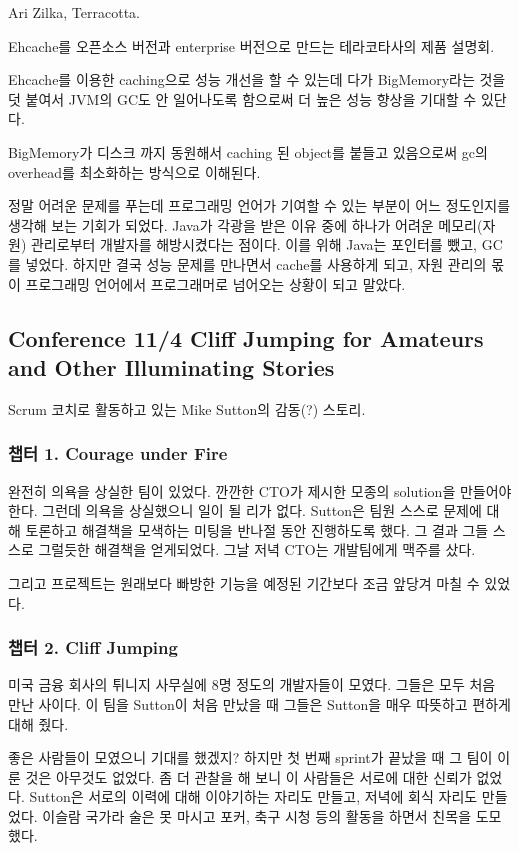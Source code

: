 \documentclass[a4paper]{article}
\begin{document}
Ari Zilka, Terracotta.
 
Ehcache를 오픈소스 버전과 enterprise 버전으로 만드는 테라코타사의 제품 설명회.
 
Ehcache를 이용한 caching으로 성능 개선을 할 수 있는데 다가
BigMemory라는 것을 덧 붙여서 JVM의 GC도 안 일어나도록 함으로써 더 높은
성능 향상을 기대할 수 있단다.
 
BigMemory가 디스크 까지 동원해서 caching 된 object를 붙들고 있음으로써
gc의 overhead를 최소화하는 방식으로 이해된다.
 
정말 어려운 문제를 푸는데 프로그래밍 언어가 기여할 수 있는 부분이 어느 
정도인지를 생각해 보는 기회가 되었다. 
Java가 각광을 받은 이유 중에 하나가 어려운 메모리(자원) 관리로부터 개발자를 
해방시켰다는 점이다. 이를 위해 Java는 포인터를 뺐고, GC를 넣었다. 
하지만 결국 성능 문제를 만나면서 cache를 사용하게 되고, 자원 관리의 몫이 
프로그래밍 언어에서 프로그래머로 넘어오는 상황이 되고 말았다.

\subsection{Conference 11/4 Cliff Jumping for Amateurs and Other
  Illuminating Stories}
 
Scrum 코치로 활동하고 있는 Mike Sutton의 감동(?) 스토리.
 
\subsubsection{챕터 1. Courage under Fire}
 
완전히 의욕을 상실한 팀이 있었다. 깐깐한 CTO가 제시한 모종의 solution을
만들어야 한다.  그런데 의욕을 상실했으니 일이 될 리가 없다. Sutton은
팀원 스스로 문제에 대해 토론하고 해결책을 모색하는 미팅을 반나절 동안
진행하도록 했다. 그 결과 그들 스스로 그럴듯한 해결책을 얻게되었다. 그날
저녁 CTO는 개발팀에게 맥주를 샀다.
 
그리고 프로젝트는 원래보다 빠방한 기능을 예정된 기간보다 조금 앞당겨 마칠 수 
있었다.
 
\subsubsection{챕터 2. Cliff Jumping}
 
미국 금융 회사의 튀니지 사무실에 8명 정도의 개발자들이 모였다. 그들은
모두 처음 만난 사이다.  이 팀을 Sutton이 처음 만났을 때 그들은 Sutton을
매우 따뜻하고 편하게 대해 줬다.
 
좋은 사람들이 모였으니 기대를 했겠지? 하지만 첫 번째 sprint가 끝났을 때
그 팀이 이룬 것은 아무것도 없었다. 좀 더 관찰을 해 보니 이 사람들은
서로에 대한 신뢰가 없었다. Sutton은 서로의 이력에 대해 이야기하는
자리도 만들고, 저녁에 회식 자리도 만들었다. 이슬람 국가라 술은 못
마시고 포커, 축구 시청 등의 활동을 하면서 친목을 도모했다.
 
\end{document}
